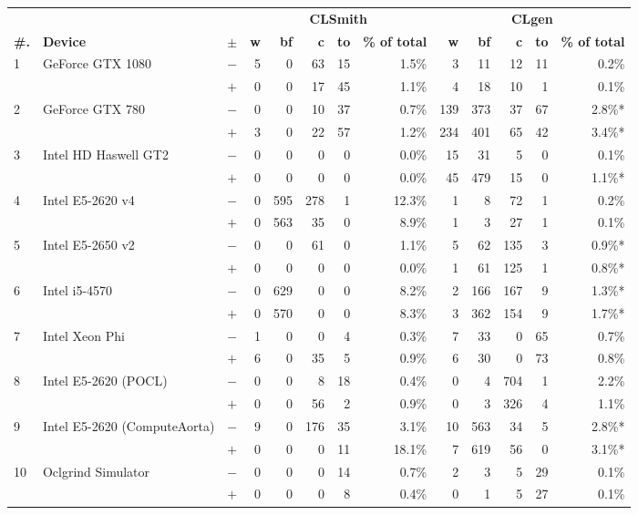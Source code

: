   \begin{tabular}{lll | rrrrr | rrrrr }
  \toprule
  & & & \multicolumn{5}{c|}{\textbf{CLSmith}} & \multicolumn{5}{c}{\textbf{CLgen}} \\
  \textbf{\#.} & \textbf{Device} & $\pm$ &
  \textbf{w} & \textbf{bf} & \textbf{c} & \textbf{to} & \textbf{\% of total} &
  \textbf{w} & \textbf{bf} & \textbf{c} & \textbf{to} & \textbf{\% of total} \\
  \midrule
  \multirow{ 2}{*}{1} & \multirow{ 2}{*}{GeForce GTX 1080} & $-$ & 5 & 0 & 63 & 15 & 1.5\%       & 3 & 11 & 12 & 11 & 0.2\% \\& & $+$ & 0 & 0 & 17 & 45 & 1.1\% & 4 & 18 & 10 & 1 & 0.1\% \\
\hline
\multirow{ 2}{*}{2} & \multirow{ 2}{*}{GeForce GTX 780} & $-$ & 0 & 0 & 10 & 37 & 0.7\%       & 139 & 373 & 37 & 67 & 2.8\%* \\& & $+$ & 3 & 0 & 22 & 57 & 1.2\% & 234 & 401 & 65 & 42 & 3.4\%* \\
\hline
\multirow{ 2}{*}{3} & \multirow{ 2}{*}{Intel HD Haswell GT2} & $-$ & 0 & 0 & 0 & 0 & 0.0\%       & 15 & 31 & 5 & 0 & 0.1\% \\& & $+$ & 0 & 0 & 0 & 0 & 0.0\% & 45 & 479 & 15 & 0 & 1.1\%* \\
\hline
\multirow{ 2}{*}{4} & \multirow{ 2}{*}{Intel E5-2620 v4} & $-$ & 0 & 595 & 278 & 1 & 12.3\%       & 1 & 8 & 72 & 1 & 0.2\% \\& & $+$ & 0 & 563 & 35 & 0 & 8.9\% & 1 & 3 & 27 & 1 & 0.1\% \\
\hline
\multirow{ 2}{*}{5} & \multirow{ 2}{*}{Intel E5-2650 v2} & $-$ & 0 & 0 & 61 & 0 & 1.1\%       & 5 & 62 & 135 & 3 & 0.9\%* \\& & $+$ & 0 & 0 & 0 & 0 & 0.0\% & 1 & 61 & 125 & 1 & 0.8\%* \\
\hline
\multirow{ 2}{*}{6} & \multirow{ 2}{*}{Intel i5-4570} & $-$ & 0 & 629 & 0 & 0 & 8.2\%       & 2 & 166 & 167 & 9 & 1.3\%* \\& & $+$ & 0 & 570 & 0 & 0 & 8.3\% & 3 & 362 & 154 & 9 & 1.7\%* \\
\hline
\multirow{ 2}{*}{7} & \multirow{ 2}{*}{Intel Xeon Phi} & $-$ & 1 & 0 & 0 & 4 & 0.3\%       & 7 & 33 & 0 & 65 & 0.7\% \\& & $+$ & 6 & 0 & 35 & 5 & 0.9\% & 6 & 30 & 0 & 73 & 0.8\% \\
\hline
\multirow{ 2}{*}{8} & \multirow{ 2}{*}{Intel E5-2620 (POCL)} & $-$ & 0 & 0 & 8 & 18 & 0.4\%       & 0 & 4 & 704 & 1 & 2.2\% \\& & $+$ & 0 & 0 & 56 & 2 & 0.9\% & 0 & 3 & 326 & 4 & 1.1\% \\
\hline
\multirow{ 2}{*}{9} & \multirow{ 2}{*}{Intel E5-2620 (ComputeAorta)} & $-$ & 9 & 0 & 176 & 35 & 3.1\%       & 10 & 563 & 34 & 5 & 2.8\%* \\& & $+$ & 0 & 0 & 0 & 11 & 18.1\% & 7 & 619 & 56 & 0 & 3.1\%* \\
\hline
\multirow{ 2}{*}{10} & \multirow{ 2}{*}{Oclgrind Simulator} & $-$ & 0 & 0 & 0 & 14 & 0.7\%       & 2 & 3 & 5 & 29 & 0.1\% \\& & $+$ & 0 & 0 & 0 & 8 & 0.4\% & 0 & 1 & 5 & 27 & 0.1\% \\
  \bottomrule
\end{tabular}

